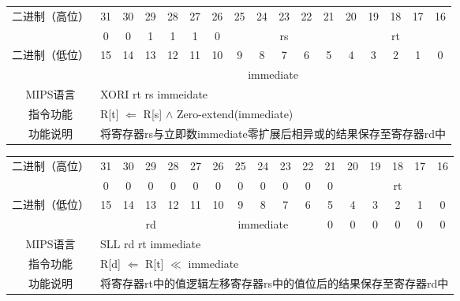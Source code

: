 \begin{table}
\begin{tabular}{|c|c|c|c|c|c|c|c|c|c|c|c|c|c|c|c|c|}
\hline
\multirow{2}{*}{二进制（高位）} &
31&30&29&28&27&26&25&24&23&22&21&20&19&18&17&16\\
\cline{2-17}
&
0&0&1&1&1&
0&
\multicolumn{5}{c|}{rs}&
\multicolumn{5}{c|}{rt}\\
\hline
\multirow{2}{*}{二进制（低位）} &
15&14&13&12&11&10&9&8&7&6&5&4&3&2&1&0\\
\cline{2-17}
&
\multicolumn{16}{c|}{immediate}\\
\hline
MIPS语言&
\multicolumn{16}{l|}{XORI rt rs immeidate}\\
\hline
指令功能&
\multicolumn{16}{l|}{R[t] $\Leftarrow$ R[s] $\land$ Zero-extend(immediate)}\\
\hline
功能说明&
\multicolumn{16}{l|}{将寄存器rs与立即数immediate零扩展后相异或的结果保存至寄存器rd中}\\
\hline
\end{tabular}
\end{table}

\begin{table}
\begin{tabular}{|c|c|c|c|c|c|c|c|c|c|c|c|c|c|c|c|c|}
\hline
\multirow{2}{*}{二进制（高位）} &
31&30&29&28&27&26&25&24&23&22&21&20&19&18&17&16\\
\cline{2-17}
&
0&0&0&0&0&
0&0&0&0&0&
0&
\multicolumn{5}{c|}{rt}\\
\hline
\multirow{2}{*}{二进制（低位）} &
15&14&13&12&11&10&9&8&7&6&5&4&3&2&1&0\\
\cline{2-17}
&
\multicolumn{5}{c|}{rd} &
\multicolumn{5}{c|}{immediate} &
0&0&0&0&0&
0\\
\hline
MIPS语言&
\multicolumn{16}{l|}{SLL rd rt immediate}\\
\hline
指令功能&
\multicolumn{16}{l|}{R[d] $\Leftarrow$ R[t] $\ll$ immediate}\\
\hline
功能说明&
\multicolumn{16}{l|}{将寄存器rt中的值逻辑左移寄存器rs中的值位后的结果保存至寄存器rd中}\\
\hline
\end{tabular}
\end{table}

\clearpage

